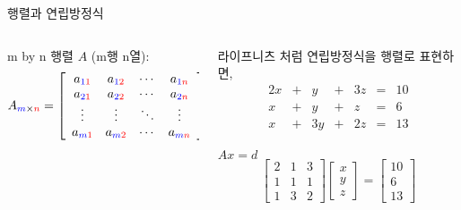 \documentclass[aspectratio=169]{beamer}
\begin{document}
\begin{frame}{행렬과 연립방정식}
  \begin{columns}
    \begin{column}{0.5\textwidth}
      m by n 행렬 $A$ (m행 n열): \\
      \[
        A_{\textcolor{blue}{m}\times \textcolor{red}{n}} =
        \left[ {\begin{array}{cccc}
          a_{\textcolor{blue}{1}\textcolor{red}{1}} & a_{\textcolor{blue}{1}\textcolor{red}{2}} & \cdots & a_{\textcolor{blue}{1}\textcolor{red}{n}}\\
          a_{\textcolor{blue}{2}\textcolor{red}{1}} & a_{\textcolor{blue}{2}\textcolor{red}{2}} & \cdots & a_{\textcolor{blue}{2}\textcolor{red}{n}}\\
          \vdots & \vdots & \ddots & \vdots\\
          a_{\textcolor{blue}{m}\textcolor{red}{1}} & a_{\textcolor{blue}{m}\textcolor{red}{2}} & \cdots & a_{\textcolor{blue}{m}\textcolor{red}{n}}\\
        \end{array} } \right]
      \]    
    \end{column}
    \begin{column}{0.5\textwidth}
      라이프니츠 처럼 연립방정식을 행렬로 표현하면,\\
      \begin{alignat*}{4}
        2x & {}+{} &  y & {}+{} & 3z & {}={} & 10 \\
         x & {}+{} &  y & {}+{} &  z & {}={} &  6 \\
         x & {}+{} & 3y & {}+{} & 2z & {}={} & 13
      \end{alignat*}
      \centering{$\Downarrow$}\\
      $Ax = d$
      \[      
      \begin{bmatrix}
        2 & 1 & 3 \\
        1 & 1 & 1 \\
        1 & 3 & 2 
      \end{bmatrix}
      \begin{bmatrix}
        x \\ y \\ z 
      \end{bmatrix}
      =
      \begin{bmatrix}
        10 \\ 6 \\ 13 
      \end{bmatrix}
      \]
    \end{column}
  \end{columns}
\end{frame}
\end{document}
